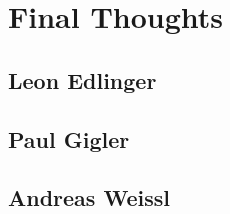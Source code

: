 \Author{\daAuthorOne}

\section{Final Thoughts}

\subsection{Leon Edlinger}

\subsection{Paul Gigler}

\subsection{Andreas Weissl}
